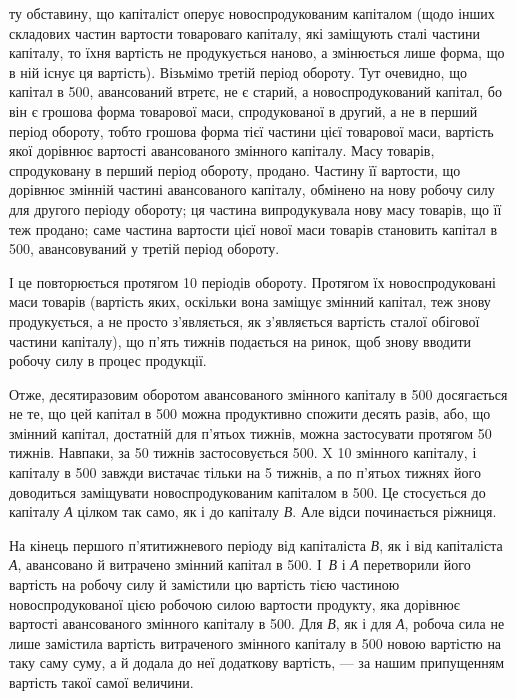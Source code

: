 \parcont{}  %
ту обставину, що капіталіст оперує новоспродукованим капіталом (щодо
інших складових частин вартости товароваго капіталу, які заміщують
сталі частини капіталу, то їхня вартість не продукується наново, а змінюється
лише форма, що в ній існує ця вартість). Візьмімо третій період
обороту. Тут очевидно, що капітал в 500, авансований втретє,
не є старий, а новоспродукований капітал, бо він є грошова форма
товарової маси, спродукованої в другий, а не в перший період обороту,
тобто грошова форма тієї частини цієї товарової маси, вартість якої
дорівнює вартості авансованого змінного капіталу. Масу товарів, спродуковану
в перший період обороту, продано. Частину її вартости, що дорівнює
змінній частині авансованого капіталу, обмінено на нову робочу
силу для другого періоду обороту; ця частина випродукувала нову масу
товарів, що її теж продано; саме частина вартости цієї нової маси
товарів становить капітал в 500, авансовуваний у третій період
обороту.

І це повторюється протягом 10 періодів обороту. Протягом їх новоспродуковані
маси товарів (вартість яких, оскільки вона заміщує змінний
капітал, теж знову продукується, а не просто з’являється, як з’являється
вартість сталої обігової частини капіталу), що п’ять тижнів подається
на ринок, щоб знову вводити робочу силу в процес продукції.

Отже, десятиразовим оборотом авансованого змінного капіталу в 500 досягається не те, що цей капітал в 500 можна продуктивно
спожити десять разів, або, що змінний капітал, достатній для
п’ятьох тижнів, можна застосувати протягом 50 тижнів. Навпаки, за 50
тижнів застосовується 500. X 10 змінного капіталу, і капіталу в
500 завжди вистачає тільки на 5 тижнів, а по п’ятьох тижнях
його доводиться заміщувати новоспродукованим капіталом в 500.
Це стосується до капіталу \emph{А} цілком так само, як і до капіталу \emph{В}. Але
відси починається ріжниця.

На кінець першого п’ятитижневого періоду від капіталіста \emph{В}, як і
від капіталіста \emph{А}, авансовано й витрачено змінний капітал в 500.
І~\emph{В} і \emph{А} перетворили його вартість на робочу силу й замістили цю вартість
тією частиною новоспродукованої цією робочою силою вартости продукту,
яка дорівнює вартості авансованого змінного капіталу в 500. Для
\emph{В}, як і для \emph{А}, робоча сила не лише замістила вартість витраченого змінного
капіталу в 500 новою вартістю на таку саму суму, а й додала
до неї додаткову вартість, — за нашим припущенням вартість такої
самої величини.


